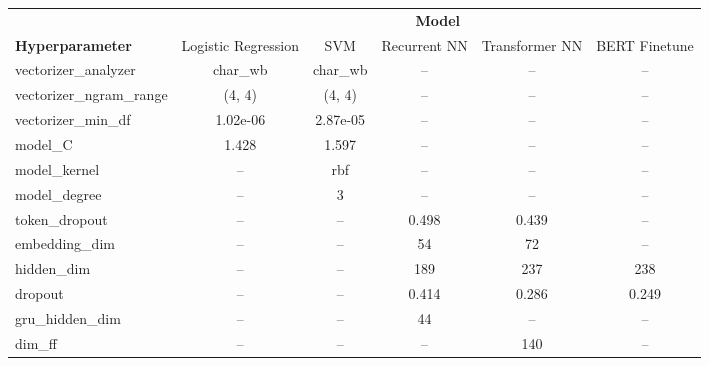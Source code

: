 \begin{table}[!ht]
\centering
\small

\begin{tabular}{lccccc}
\toprule
& \multicolumn{5}{c}{\textbf{Model}} \\
 \cmidrule(lr){2-6} 
\textbf{Hyperparameter} & Logistic Regression & SVM & Recurrent NN & Transformer NN & BERT Finetune \\
\midrule

vectorizer\_analyzer & char\_wb & char\_wb & -- & -- & -- \\
vectorizer\_ngram\_range & (4, 4) & (4, 4) & -- & -- & -- \\
vectorizer\_min\_df & 1.02e-06 & 2.87e-05 & -- & -- & -- \\
model\_C & 1.428 & 1.597 & -- & -- & -- \\
model\_kernel & -- & rbf & -- & -- & -- \\
model\_degree & -- & 3 & -- & -- & -- \\
\midrule
token\_dropout & -- & -- & 0.498 & 0.439 & -- \\
embedding\_dim & -- & -- & 54 & 72 & -- \\
hidden\_dim & -- & -- & 189 & 237 & 238 \\
dropout & -- & -- & 0.414 & 0.286 & 0.249 \\
gru\_hidden\_dim & -- & -- & 44 & -- & -- \\
dim\_ff & -- & -- & -- & 140 & -- \\

\bottomrule
\end{tabular}

\end{table}